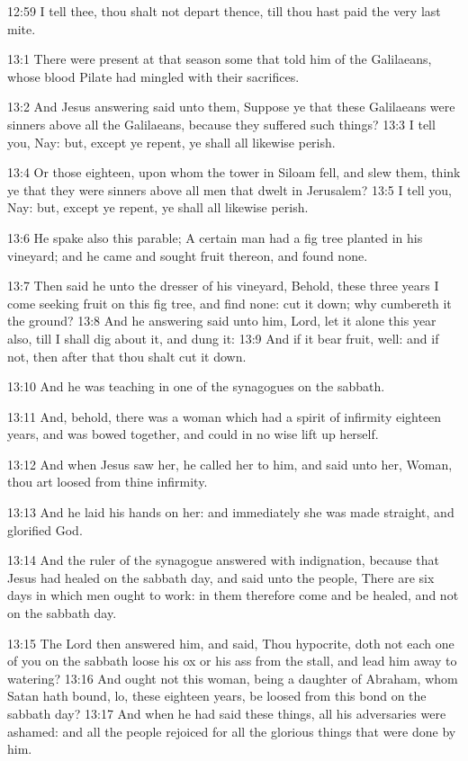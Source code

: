 12:59 I tell thee, thou shalt not depart thence, till thou hast paid
the very last mite.

13:1 There were present at that season some that told him of the
Galilaeans, whose blood Pilate had mingled with their sacrifices.

13:2 And Jesus answering said unto them, Suppose ye that these
Galilaeans were sinners above all the Galilaeans, because they
suffered such things?  13:3 I tell you, Nay: but, except ye repent, ye
shall all likewise perish.

13:4 Or those eighteen, upon whom the tower in Siloam fell, and slew
them, think ye that they were sinners above all men that dwelt in
Jerusalem?  13:5 I tell you, Nay: but, except ye repent, ye shall all
likewise perish.

13:6 He spake also this parable; A certain man had a fig tree planted
in his vineyard; and he came and sought fruit thereon, and found none.

13:7 Then said he unto the dresser of his vineyard, Behold, these
three years I come seeking fruit on this fig tree, and find none: cut
it down; why cumbereth it the ground?  13:8 And he answering said unto
him, Lord, let it alone this year also, till I shall dig about it, and
dung it: 13:9 And if it bear fruit, well: and if not, then after that
thou shalt cut it down.

13:10 And he was teaching in one of the synagogues on the sabbath.

13:11 And, behold, there was a woman which had a spirit of infirmity
eighteen years, and was bowed together, and could in no wise lift up
herself.

13:12 And when Jesus saw her, he called her to him, and said unto her,
Woman, thou art loosed from thine infirmity.

13:13 And he laid his hands on her: and immediately she was made
straight, and glorified God.

13:14 And the ruler of the synagogue answered with indignation,
because that Jesus had healed on the sabbath day, and said unto the
people, There are six days in which men ought to work: in them
therefore come and be healed, and not on the sabbath day.

13:15 The Lord then answered him, and said, Thou hypocrite, doth not
each one of you on the sabbath loose his ox or his ass from the stall,
and lead him away to watering?  13:16 And ought not this woman, being
a daughter of Abraham, whom Satan hath bound, lo, these eighteen
years, be loosed from this bond on the sabbath day?  13:17 And when he
had said these things, all his adversaries were ashamed: and all the
people rejoiced for all the glorious things that were done by him.

